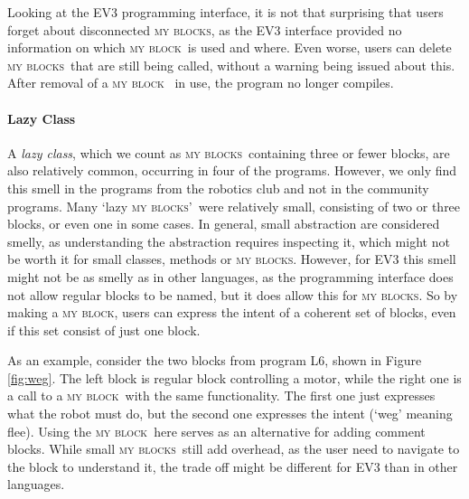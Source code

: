 \documentclass[conference]{IEEEtran}
\newcommand{\mbs}{\textsc{my blocks}}
\newcommand{\mb}{\textsc{my block}}
\begin{document}
Looking at the EV3 programming interface, it is not that surprising that users forget about disconnected \mbs, as the EV3 interface provided no information on which \mb~is used and where. Even worse, users can delete \mbs~that are still being called, without a warning being issued about this. After removal of a \mb~ in use, the program no longer compiles.



\paragraph{Lazy Class}
A \emph{lazy class}, which we count as \mbs~containing three or fewer blocks, are also relatively common, occurring in four of the programs. However, we only find this smell in the programs from the robotics club and not in the community programs. Many `lazy \mbs'~were relatively small, consisting of two or three blocks, or even one in some cases. In general, small abstraction are considered smelly, as understanding the abstraction requires inspecting it, which might not be worth it for small classes, methods or \mbs. However, for EV3 this smell might not be as smelly as in other languages, as the programming interface does not allow regular blocks to be named, but it does allow this for \mbs. So by making a \mb, users can express the intent of a coherent set of blocks, even if this set consist of just one block. 

As an example, consider the two blocks from program L6, shown in Figure \ref{fig:weg}. The left block is regular block controlling a motor, while the right one is a call to a \mb~with the same functionality. The first one just expresses what the robot must do, but the second one expresses the intent (`weg' meaning flee). Using the \mb~here serves as an alternative for adding comment blocks. While small \mbs~still add overhead, as the user need to navigate to the block to understand it, the trade off might be different for EV3 than in other languages.

\end{document}
